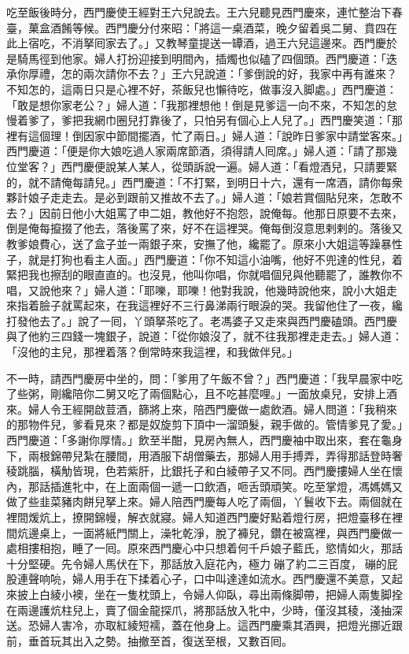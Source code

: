 吃至飯後時分，西門慶使王經對王六兒說去。王六兒聽見西門慶來，連忙整治下春臺，菓盒酒餚等候。西門慶分付來昭：「將這一桌酒菜，晚夕留着吳二舅、賁四在此上宿吃，不消拏囘家去了。」又教琴童提送一罈酒，過王六兒這邊來。西門慶於是騎馬徑到他家。婦人打扮迎接到明間內，插燭也似磕了四個頭。西門慶道：「迭承你厚禮，怎的兩次請你不去？」王六兒說道：「爹倒說的好，我家中再有誰來？不知怎的，這兩日只是心裡不好，茶飯兒也懶待吃，做事沒入脚處。」西門慶道：「敢是想你家老公？」婦人道：「我那裡想他！倒是見爹這一向不來，不知怎的怠慢着爹了，爹把我網巾圈兒打靠後了，只怕另有個心上人兒了。」西門慶笑道：「那裡有這個理！倒因家中節間擺酒，忙了兩日。」婦人道：「說昨日爹家中請堂客來。」西門慶道：「便是你大娘吃過人家兩席節酒，須得請人囘席。」婦人道：「請了那幾位堂客？」西門慶便說某人某人，從頭訴說一遍。婦人道：「看燈酒兒，只請要緊的，就不請俺每請兒。」西門慶道：「不打緊，到明日十六，還有一席酒，請你每衆夥計娘子走走去。是必到跟前又推故不去了。」婦人道：「娘若賞個貼兒來，怎敢不去？」{}因前日他小大姐罵了申二姐，教他好不抱怨，說俺每。他那日原要不去來，倒是俺每攛掇了他去，落後罵了來，好不在這裡哭。俺每倒沒意思剌剌的。落後又教爹娘費心，送了盒子並一兩銀子來，安撫了他，纔罷了。原來小大姐這等躁暴性子，就是打狗也看主人面。」西門慶道：「你不知這小油嘴，他好不兜達的性兒，着緊把我也擦刮的眼直直的。也沒見，他叫你唱，你就唱個兒與他聽罷了，誰教你不唱，又說他來？」婦人道：「耶嚛，耶嚛！他對我說，他幾時說他來，說小大姐走來指着臉子就罵起來，在我這裡好不三行鼻涕兩行眼淚的哭。我留他住了一夜，纔打發他去了。」說了一囘，丫頭拏茶吃了。老馮婆子又走來與西門慶磕頭。西門慶與了他約三四錢一塊銀子，說道：「從你娘沒了，就不往我那裡走走去。」婦人道：「沒他的主兒，那裡着落？倒常時來我這裡，和我做伴兒。」

不一時，請西門慶房中坐的，問：「爹用了午飯不曾？」西門慶道：「我早晨家中吃了些粥，剛纔陪你二舅又吃了兩個點心，且不吃甚麼哩。」一面放桌兒，安排上酒來。婦人令王經開啟荳酒，篩將上來，陪西門慶做一處飲酒。婦人問道：「我稍來的那物件兒，爹看見來？都是奴旋剪下頂中一溜頭髮，親手做的。管情爹見了愛。」西門慶道：「多謝你厚情。」飲至半酣，見房內無人，西門慶袖中取出來，{}套在龜身下，兩根錦帶兒紮在腰間，用酒服下胡僧藥去，那婦人用手搏弄，弄得那話登時奢稜跳腦，橫觔皆現，色若紫肝，比銀托子和白綾帶子又不同。西門慶摟婦人坐在懷內，那話插進牝中，在上面兩個一遞一口飲酒，咂舌頭頑笑。吃至掌燈，馮媽媽又做了些韭菜豬肉餅兒拏上來。婦人陪西門慶每人吃了兩個，丫鬟收下去。兩個就在裡間煖炕上，撩開錦幔，解衣就寢。婦人知道西門慶好點着燈行房，把燈臺移在裡間炕邊桌上，一面將紙門關上，澡牝乾淨，脫了褲兒，鑽在被窩裡，與西門慶做一處相摟相抱，睡了一囘。{}原來西門慶心中只想着何千戶娘子藍氏，慾情如火，那話十分堅硬。先令婦人馬伏在下，那話放入庭花內，極力𢵞磞了約二三百度，𢵞磞的屁股連聲响喨，婦人用手在下揉着心子，口中叫達達如流水。西門慶還不美意，又起來披上白綾小襖，坐在一隻枕頭上，令婦人仰臥，尋出兩條脚帶，把婦人兩隻脚拴在兩邊護炕柱兒上，賣了個金龍探爪，將那話放入牝中，少時，僅沒其稜，淺抽深送。恐婦人害冷，亦取紅綾短襦，蓋在他身上。這西門慶乘其酒興，把燈光挪近跟前，垂首玩其出入之勢。抽撤至首，復送至根，又數百囘。

